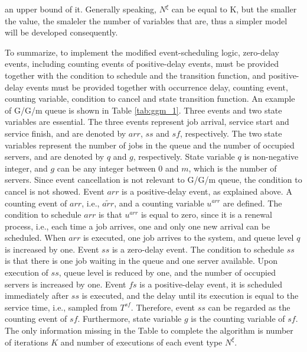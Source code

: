 \documentclass[suppldata]{interact}
\theoremstyle{plain}
\theoremstyle{definition}
\theoremstyle{remark}
\begin{document}
an upper bound of it. Generally speaking, $N^{\xi}$ can be equal to K, but the smaller the value, the smaleler the number of variables that are, thus a simpler model will be developed consequently.


To summarize, to implement the modified event-scheduling logic, zero-delay events, including counting events of positive-delay events, must be provided together with the condition to schedule and the transition function, and positive-delay events must be provided together with occurrence delay, counting event, counting variable, condition to cancel and state transition function. An example of G/G/m queue is shown in Table \ref{tab:ggm_1}. Three events and two state variables are essential. The three events represent job arrival, service start and service finish, and are denoted by ${arr}$, ${ss}$ and ${sf}$, respectively. The two state variables represent the number of jobs in the queue and the number of occupied servers, and are denoted by $q$ and $g$, respectively. State variable $q$ is non-negative integer, and $g$ can be any integer between $0$ and $m$, which is the number of servers. Since event cancellation is not relevant to G/G/m queue, the condition to cancel is not showed. Event ${arr}$ is a positive-delay event, as explained above. %
A counting event of ${arr}$, i.e., ${\tilde{arr}}$, and a counting variable $u^{arr}$ are defined. The condition to schedule ${arr}$ is that $u^{arr}$ is equal to zero, since it is a renewal process, i.e., each time a job arrives, one and only one new arrival can be scheduled. When ${arr}$ is executed, one job arrives to the system, and queue level $q$ is increased by one. Event ${ss}$ is a zero-delay event. The condition to schedule ${ss}$ is that there is one job waiting in the queue and one server available. Upon execution of ${ss}$, queue level is reduced by one, and the number of occupied servers is increased by one. Event ${fs}$ is a positive-delay event, it is scheduled immediately after ${ss}$ is executed, and the delay until its execution is equal to the service time, i.e., sampled from $T^{sf}$. Therefore, event ${ss}$ can be regarded as the counting event of ${sf}$. Furthermore, state variable $g$ is the counting variable of ${sf}$. %
The only information missing in the Table to complete the algorithm is number of iterations $K$ and number of executions of each event type $N^{\xi}$. 
\end{document}
